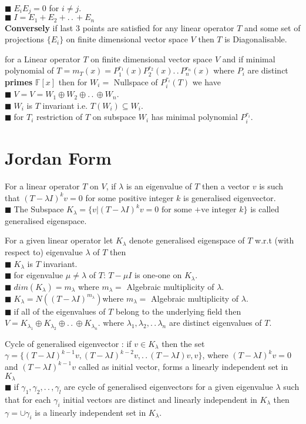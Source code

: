 \documentclass[11pt]{extarticle}
\newcommand{\F}{\mathbb{F}}
\newcommand{\w}[1]{\text{#1}}
\newcommand{\ck}{.\,.\,}
\newcommand{\tbx}[2][]{
	\begin{tcolorbox}[enhanced,breakable,size=small,colback=black!2!white,title={#1},arc is angular, arc=1.5mm,drop fuzzy shadow]
		#2
	\end{tcolorbox}
}
\newcommand{\yi}{\\$\blacksquare\;$}
\begin{document}
\begin{multicols}{2}
{   	\yi $ E_iE_j=0 $ for $ i\neq j $.
   	\yi $ I=E_1+E_2+\ck +E_n $ \\
   	  \textbf{Conversely} if last 3 points are satisfied for any linear operator $ T $ and some set of projections $ \{E_i\} $ on finite dimensional vector space $ V $ then $ T $ is Diagonalisable.}
   	  \tbx[Primary Decomposition Theorem]{ for a Linear operator $ T $ on finite dimensional vector space $ V $ and if minimal polynomial of $ T =m_T(x)=P_1^{r_1}(x)P_2^{r_2}(x)\ck P_n^{r_n}(x)$ where $ P_i $ are distinct \textbf{primes} $ \F[x] $ then for $ W_i = $ Nullspace of $ P_i^{r_i}(T) $ we have
   	  \yi $ V=   V= W_1\oplus W_2 \oplus \ck \oplus W_n$. 
   	  \yi $ W_i $ is $ T $ invariant i.e. $ T(W_i)\subseteq W_i. $ 
   	  \yi for $ T_i $ restriction of $ T $ on subspace $ W_i $ has minimal polynomial $ P_i^{r_i} $.}
   	   \section{Jordan Form}
   	   	\tbx[Generalised eigenvectors]{ For a linear operator $ T $ on $V$, if $ \lambda $ is an eigenvalue  of $ T $ then a vector $ v $ is such that $ (T-\lambda I)^kv=0 $ for some positive integer $ k $ is generalised eigenvector.
   	   	\yi The Subspace $ K_\lambda=\{v|(T-\lambda I)^kv=0 \w{ for some +ve integer }k\} $ is called generalised eigenspace.}
   	   	\tbx[properties of generalised eigenspaces]{
   	   	For a given linear operator let $ K_\lambda $ denote generalised eigenspace of $ T $ w.r.t (with respect to) eigenvalue $ \lambda $ of $ T $ then 
   	   		\yi $ K_\lambda $ is $ T $ invariant.
   	   		\yi  for eigenvalue $ \mu \neq \lambda $ of $ T $: $ T-\mu I $ is one-one on $ K_\lambda $.
   	   		\yi $ dim(K_\lambda)=m_\lambda $ where $ m_\lambda= $ Algebraic multiplicity of $\lambda$.    
   	   		\yi $ K_\lambda=N((T-\lambda I)^{m_\lambda}) $where $ m_\lambda= $ Algebraic multiplicity of  $\lambda$.
   	   		\yi if all of the eigenvalues of $ T $ belong to the underlying field then\\
   	   		$ V=K_{\lambda_1}\oplus K_{\lambda_2}\oplus\ck\oplus K_{\lambda_n} .$  where $ \lambda_1,\lambda_2,\ck\lambda_n  $ are distinct eigenvalues of $ T $.   }
   	   		\tbx{Cycle of generalised eigenvector : if  $ v\in K_\lambda $ then the set $ \gamma=\{(T-\lambda I)^{k-1}v,(T-\lambda I)^{k-2}v,\ck (T-\lambda I)v,v\} $, where $ (T-\lambda I)^kv=0 $ and $ (T-\lambda I)^{k-1}v $ called as initial vector, forms a linearly independent set in $ K_\lambda $
   	   		\yi if $ \gamma_1,\gamma_2,\ck, \gamma_l $ are cycle of generalised eigenvectors for a given eigenvalue $ \lambda $ such that for each $ \gamma_i $ initial vectors are distinct and linearly independent in $ K_\lambda $ then $ \gamma=\cup \gamma_i $ is a linearly independent set in $ K_\lambda $.}

\end{multicols}
\end{document}
